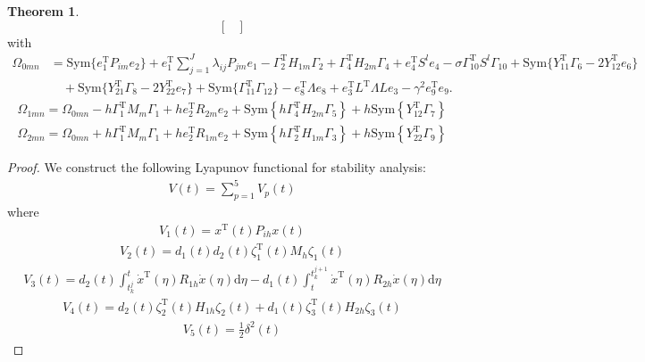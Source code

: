 \documentclass[preprint,review,fleqn,sort&compress,3p]{elsarticle}
\theoremstyle{definition} %
\theoremstyle{definition}%
\newtheorem{thm}{Theorem}[section]
\begin{document}
\begin{thm}
\begin{equation}
\begin{bmatrix}
	\end{bmatrix}
\end{equation}
with
\begin{align*}
\Omega_{0mn}
&= \mathrm{Sym}\{e_1^{\mathrm{T}}P_{im}e_2\}
+e_1^{\mathrm{T}}\sum_{j=1}^{J}\lambda_{ij}P_{jm}e_1
-\Gamma_2^{\mathrm{T}}H_{1m}\Gamma_2
+\Gamma_4^{\mathrm{T}}H_{2m}\Gamma_4
 +e_4^{\mathrm{T}}S^le_4
-\sigma\Gamma_{10}^{\mathrm{T}}S^l\Gamma_{10}
+\mathrm{Sym}\{Y_{11}^{\mathrm{T}}\Gamma_6-2Y_{12}^{\mathrm{T}}e_6\}
\\
&\quad
+\mathrm{Sym}\{Y_{21}^{\mathrm{T}}\Gamma_8-2Y_{22}^{\mathrm{T}}e_7\}
+\mathrm{Sym}\{\Gamma_{11}^{\mathrm{T}}\Gamma_{12}\}
-e_8^{\mathrm{T}}\Lambda e_8
+e_3^{\mathrm{T}}L^{\mathrm{T}}\Lambda Le_3
-\gamma^2e_9^{\mathrm{T}}e_9 .
\end{align*}
\begin{align*}
	\Omega_{1mn} =   \Omega_{0mn}
	-h \Gamma_{1}^{\mathrm{T}}{M}_{m}
	\Gamma_{1}
	+ h e_{2}^{\mathrm{T}} R_{2m} e_{2}
	+  \mathrm{Sym} \left\{ 
	h\Gamma_{4}^{\mathrm{T}} H_{2m} \Gamma_{5} \right\}
	+h \mathrm{Sym} \left\{ 
	Y_{12}^{\mathrm{T}}\Gamma_{7}
	\right\}
\end{align*}
\begin{align*}
	\Omega_{2mn} = \Omega_{0mn} 
	+h \Gamma_{1}^{\mathrm{T}}{M}_{m}
	\Gamma_{1}
	+he_{2}^{\mathrm{T}} R_{1m} e_{2}
	+\mathrm{Sym} \left\{ 
	h\Gamma_{2}^{\mathrm{T}} H_{1m} \Gamma_{3} \right\}
	+h \mathrm{Sym} \left\{ 
	Y_{22}^{\mathrm{T}}\Gamma_{9}
	\right\}
\end{align*}
	
\begin{proof} 
	We construct the following Lyapunov functional for stability analysis:
	\begin{align}\label{V}
		V(t) =\sum_{p=1}^{5} V_p(t)
	\end{align}
	where 
	\begin{align}
		V_1(t) = x^{\mathrm{T}}(t)P_{ih}x(t)
	\end{align}
	\begin{align}
		V_2(t) = d_1(t) d_2(t)
		\zeta_1^{\mathrm{T}}(t)
		M_{h} \zeta_1(t)
	\end{align}
	\begin{align}
		V_3(t) = 
		d_2(t) \int_{t_k^j}^{t} \dot{x}^\mathrm{T}(\eta) R_{1h} \dot{x}(\eta) \mathrm{d}\eta 
		- d_1(t) \int_{t}^{t_{k}^{j+1}} \dot{x}^\mathrm{T}(\eta) R_{2h} \dot{x}(\eta) \mathrm{d}\eta
	\end{align}
	\begin{align}
		V_4(t) = d_2(t) \zeta_2^{\mathrm{T}}(t) H_{1h} \zeta_2(t) + d_1(t) \zeta_3^{\mathrm{T}}(t) H_{2h} \zeta_3(t)
	\end{align}
	\begin{align}
		V_5(t) = \frac{1}{2} \delta^2(t)
	\end{align}
	

\end{proof}
\end{thm}
\end{document}
